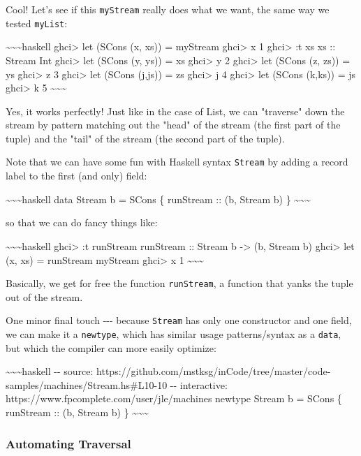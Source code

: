\documentclass[]{article}
\begin{document}
Cool! Let's see if this \texttt{myStream} really does what we want, the same way
we tested \texttt{myList}:

\textasciitilde{}\textasciitilde{}\textasciitilde{}haskell ghci\textgreater{}
let (SCons (x, xs)) = myStream ghci\textgreater{} x 1 ghci\textgreater{} :t xs
xs :: Stream Int ghci\textgreater{} let (SCons (y, ys)) = xs ghci\textgreater{}
y 2 ghci\textgreater{} let (SCons (z, zs)) = ys ghci\textgreater{} z 3
ghci\textgreater{} let (SCons (j,js)) = zs ghci\textgreater{} j 4
ghci\textgreater{} let (SCons (k,ks)) = js ghci\textgreater{} k 5
\textasciitilde{}\textasciitilde{}\textasciitilde{}

Yes, it works perfectly! Just like in the case of List, we can "traverse" down
the stream by pattern matching out the "head" of the stream (the first part of
the tuple) and the "tail" of the stream (the second part of the tuple).

Note that we can have some fun with Haskell syntax \texttt{Stream} by adding a
record label to the first (and only) field:

\textasciitilde{}\textasciitilde{}\textasciitilde{}haskell data Stream b = SCons
\{ runStream :: (b, Stream b) \}
\textasciitilde{}\textasciitilde{}\textasciitilde{}

so that we can do fancy things like:

\textasciitilde{}\textasciitilde{}\textasciitilde{}haskell ghci\textgreater{} :t
runStream runStream :: Stream b -\textgreater{} (b, Stream b) ghci\textgreater{}
let (x, xs) = runStream myStream ghci\textgreater{} x 1
\textasciitilde{}\textasciitilde{}\textasciitilde{}

Basically, we get for free the function \texttt{runStream}, a function that
yanks the tuple out of the stream.

One minor final touch -\/-\/- because \texttt{Stream} has only one constructor
and one field, we can make it a \texttt{newtype}, which has similar usage
patterns/syntax as a \texttt{data}, but which the compiler can more easily
optimize:

\textasciitilde{}\textasciitilde{}\textasciitilde{}haskell -\/- source:
https://github.com/mstksg/inCode/tree/master/code-samples/machines/Stream.hs\#L10-10
-\/- interactive: https://www.fpcomplete.com/user/jle/machines newtype Stream b
= SCons \{ runStream :: (b, Stream b) \}
\textasciitilde{}\textasciitilde{}\textasciitilde{}

\subsubsection{Automating Traversal}
\end{document}
